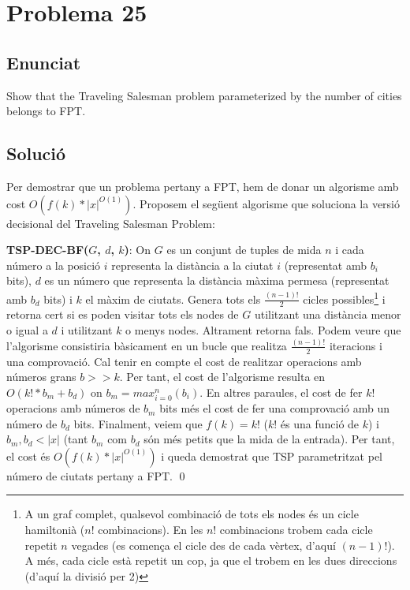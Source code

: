 \section{Problema 25}
\subsection{Enunciat}
Show that the Traveling Salesman problem parameterized by the number of cities belongs to FPT.
\subsection{Solució}
Per demostrar que un problema pertany a FPT, hem de donar un algorisme amb cost $O(f(k)*|x|^{O(1)})$.
Proposem el següent algorisme que soluciona la versió decisional del Traveling Salesman Problem:
\newline
\par
\textbf{TSP-DEC-BF($G$, $d$, $k$)}: On $G$ es un conjunt de tuples de mida $n$ i cada número a la posició $i$ representa la distància a la ciutat $i$ (representat amb $b_i$ bits), $d$ es un número que representa la distància màxima permesa (representat amb $b_d$ bits) i $k$ el màxim de ciutats. Genera tots els $\frac{(n-1)!}{2}$ cicles possibles\footnote{A un graf complet, qualsevol combinació de tots els nodes és un cicle hamiltonià ($n!$ combinacions). En les $n!$ combinacions trobem cada cicle repetit $n$ vegades (es comença el cicle des de cada vèrtex, d'aquí $(n-1)!$). A més, cada cicle està repetit un cop, ja que el trobem en les dues direccions (d'aquí la divisió per 2)} i retorna cert si es poden visitar tots els nodes de $G$ utilitzant una distància menor o igual a $d$ i utilitzant $k$ o menys nodes. Altrament retorna fals.
\newline
\newline
Podem veure que l'algorisme consistiria bàsicament en un bucle que realitza $\frac{(n-1)!}{2}$ iteracions i una comprovació. Cal tenir en compte el cost de realitzar operacions amb números grans $b>>k$. Per tant, el cost de l'algorisme resulta en $O(k!*b_m+b_d)$ on $b_m = max_{i=0}^{n}(b_i)$. En altres paraules, el cost de fer $k!$ operacions amb números de $b_m$ bits més el cost de fer una comprovació amb un número de $b_d$ bits. Finalment, veiem que $f(k) = k!$ ($k!$ és una funció de $k$) i $b_m, b_d < |x|$ (tant $b_m$ com $b_d$ són més petits que la mida de la entrada). Per tant, el cost és $O(f(k)*|x|^{O(1)})$ i queda demostrat que TSP parametritzat pel número de ciutats pertany a FPT.
\qed
